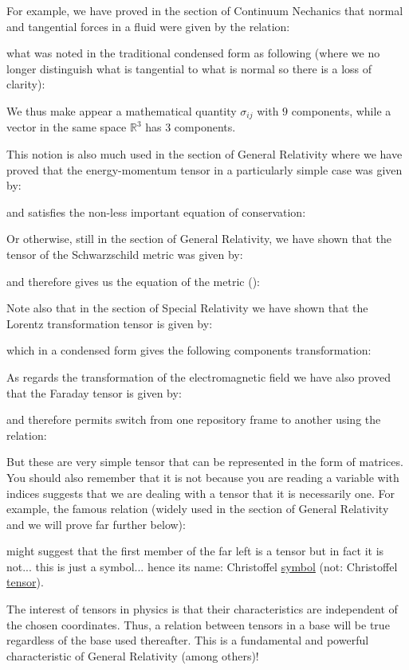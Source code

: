 	For example, we have proved in the section of Continuum Nechanics that normal and tangential forces in a fluid were given by the relation:
	
	what was noted in the traditional condensed form as following (where we no longer distinguish what is tangential to what is normal so there is a loss of clarity):
	
	We thus make appear a mathematical quantity $\sigma_{ij}$ with $9$ components, while a vector in the same space $\mathbb{R}^3$ has $3$ components.
	
	This notion is also much used in the section of General Relativity where we have proved that the energy-momentum tensor in a particularly simple case was given by:
	
	and satisfies the non-less important equation of conservation:
	
	Or otherwise, still in the section of General Relativity, we have shown that the tensor of the Schwarzschild metric was given by:
	
	and therefore gives us the equation of the metric ():
	
	Note also that in the section of Special Relativity we have shown that the Lorentz transformation tensor is given by:
	
	which in a condensed form gives the following components transformation:
	
	As regards the transformation of the electromagnetic field we have also proved that the Faraday tensor is given by:
	
	and therefore permits switch from one repository frame to another using the relation:
	
	But these are very simple tensor that can be represented in the form of matrices. You should also remember that it is not because you are reading a variable with indices suggests that we are dealing with a tensor that it is necessarily one. For example, the famous relation (widely used in the section of General Relativity and we will prove far further below):
	
	might suggest that the first member of the far left is a tensor but in fact it is not... this is just a symbol... hence its name: Christoffel \underline{symbol} (not: Christoffel \underline{tensor}).
	
	The interest of tensors in physics is that their characteristics are independent of the chosen coordinates. Thus, a relation between tensors in a base will be true regardless of the base used thereafter. This is a fundamental and powerful characteristic of General Relativity (among others)!
	
